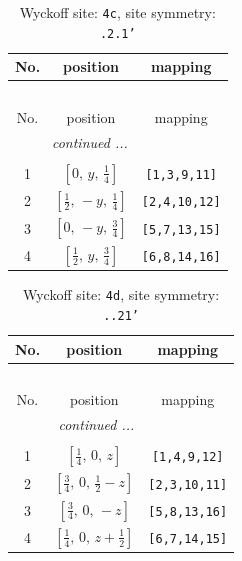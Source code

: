 \documentclass[fleqn,8pt]{jsarticle}
\begin{document}
\renewcommand{\arraystretch}{1.2}
\begin{longtable}{ccc}
\caption{Wyckoff site: {\tt 4c}, site symmetry: {\tt .2.1'}}
 \\
 \hline \hline
No. & position & mapping \\ \hline \endfirsthead

\multicolumn{2}{l}{\tablename\ \thetable{}} \\
 \hline \hline
No. & position & mapping \\ \hline \endhead

 \hline \hline
\multicolumn{2}{r}{\footnotesize\it continued ...} \\ \endfoot

 \hline \hline
\multicolumn{2}{r}{} \\ \endlastfoot

1 & $\left[ 0,\, y,\, \frac{1}{4} \right]$ & {\tt [1,3,9,11]} \\ \hline
2 & $\left[ \frac{1}{2},\, - y,\, \frac{1}{4} \right]$ & {\tt [2,4,10,12]} \\ \hline
3 & $\left[ 0,\, - y,\, \frac{3}{4} \right]$ & {\tt [5,7,13,15]} \\ \hline
4 & $\left[ \frac{1}{2},\, y,\, \frac{3}{4} \right]$ & {\tt [6,8,14,16]} \\
\end{longtable}
\renewcommand{\arraystretch}{1.2}
\begin{longtable}{ccc}
\caption{Wyckoff site: {\tt 4d}, site symmetry: {\tt ..21'}}
 \\
 \hline \hline
No. & position & mapping \\ \hline \endfirsthead

\multicolumn{2}{l}{\tablename\ \thetable{}} \\
 \hline \hline
No. & position & mapping \\ \hline \endhead

 \hline \hline
\multicolumn{2}{r}{\footnotesize\it continued ...} \\ \endfoot

 \hline \hline
\multicolumn{2}{r}{} \\ \endlastfoot

1 & $\left[ \frac{1}{4},\, 0,\, z \right]$ & {\tt [1,4,9,12]} \\ \hline
2 & $\left[ \frac{3}{4},\, 0,\, \frac{1}{2} - z \right]$ & {\tt [2,3,10,11]} \\ \hline
3 & $\left[ \frac{3}{4},\, 0,\, - z \right]$ & {\tt [5,8,13,16]} \\ \hline
4 & $\left[ \frac{1}{4},\, 0,\, z + \frac{1}{2} \right]$ & {\tt [6,7,14,15]} \\
\end{longtable}
\end{document}
